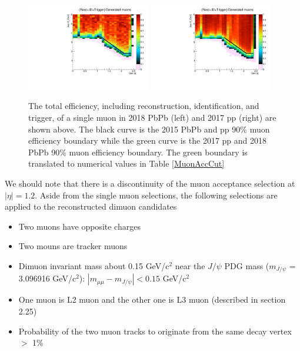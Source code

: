 \begin{figure}[h]
\begin{center}
\includegraphics[width= 0.48\textwidth]{Figures/Chapter5/MuonAccPbPb.pdf}
\includegraphics[width= 0.48\textwidth]{Figures/Chapter5/MuonAccPP.pdf}
\caption{The total efficiency, including reconstruction, identification, and trigger, of a single muon in 2018 PbPb (left) and 2017 pp (right) are shown above. The black curve is the 2015 PbPb and pp 90\% muon efficiency boundary while the green curve is the 2017 pp and 2018 PbPb 90\% muon efficiency boundary. The green boundary is translated to numerical values in Table \ref{MuonAccCut}}
\label{MuonAccPlot}
\end{center}
\end{figure}

We should note that there is a discontinuity of the muon acceptance selection at $|\eta| = 1.2$. Aside from the single muon selections, the following selections are applied to the reconstructed dimuon candidates


\begin{itemize}
\item Two muons have opposite charges 
\item Two mouns are tracker muons
\item Dimuon invariant mass about 0.15 GeV/c$^2$ near the $J/\psi$ PDG mass ($m_{J/\psi}$ = 3.096916 GeV/c$^2$): $|m_{\mu\mu} - m_{J/\psi}| < 0.15$ GeV/c$^2$
\item One muon is L2 muon and the other one is L3 muon (described in section 2.25)
\item Probability of the two muon tracks to originate from the same decay vertex $>$ 1\%
\end{itemize}


